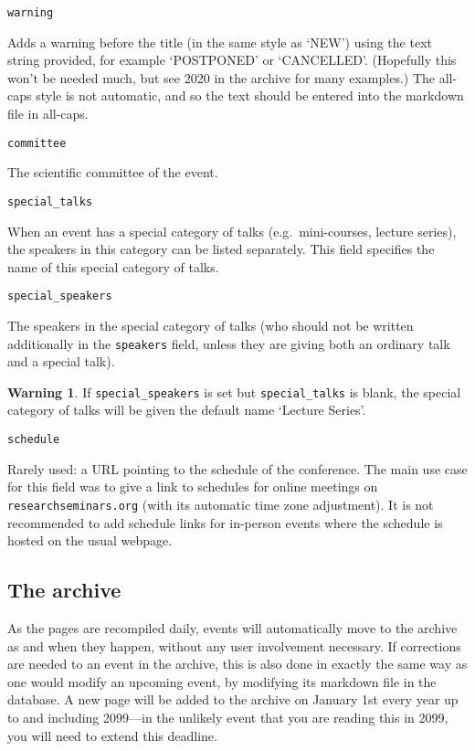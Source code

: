 \documentclass[12pt]{scrartcl}
\theoremstyle{definition}
\newtheorem*{warn}{Warning}
\begin{document}
\noindent\verb|warning|\nopagebreak

Adds a warning before the title (in the same style as `NEW') using the text string provided, for example `POSTPONED' or `CANCELLED'.
(Hopefully this won't be needed much, but see 2020 in the archive for many examples.)
The all-caps style is not automatic, and so the text should be entered into the markdown file in all-caps.
\medskip

\noindent\verb|committee|\nopagebreak

The scientific committee of the event.
\medskip

\noindent\verb|special_talks|\nopagebreak

When an event has a special category of talks (e.g.\ mini-courses, lecture series), the speakers in this category can be listed separately.
This field specifies the name of this special category of talks.
\medskip

\noindent\verb|special_speakers|\nopagebreak

The speakers in the special category of talks (who should not be written additionally in the \verb|speakers| field, unless they are giving both an ordinary talk and a special talk).

\begin{warn}
If \verb|special_speakers| is set but \verb|special_talks| is blank, the special category of talks will be given the default name `Lecture Series'.
\end{warn}

\noindent\verb|schedule|\nopagebreak

Rarely used: a URL pointing to the schedule of the conference.
The main use case for this field was to give a link to schedules for online meetings on \verb|researchseminars.org| (with its automatic time zone adjustment).
It is not recommended to add schedule links for in-person events where the schedule is hosted on the usual webpage.

\subsection{The archive}
As the pages are recompiled daily, events will automatically move to the archive as and when they happen, without any user involvement necessary.
If corrections are needed to an event in the archive, this is also done in exactly the same way as one would modify an upcoming event, by modifying its markdown file in the database.
A new page will be added to the archive on January 1st every year up to and including 2099---in the unlikely event that you are reading this in 2099, you will need to extend this deadline.
\end{document}
